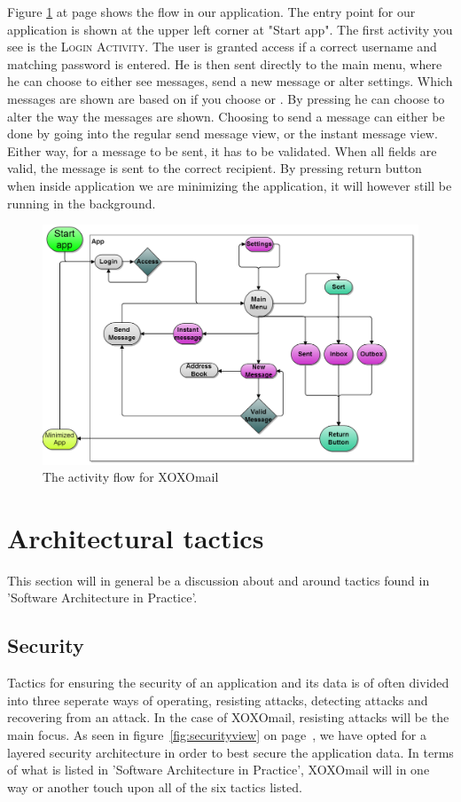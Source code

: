 Figure \ref{fig:logicalGUIview} at page \pageref{fig:logicalGUIview} shows the flow in our application. The entry point for our application is shown at the upper left corner at "Start app". The first activity you see is the \textsc{Login Activity}. The user is granted access if a correct username and matching password is entered. He is then sent directly to the main menu, where he can choose to either see messages, send a new message or alter settings. Which messages are shown are based on if you choose  or . By pressing  he can choose to alter the way the messages are shown. Choosing to send a message can either be done by going into the regular send message view, or the instant message view. Either way, for a message to be sent, it has to be validated. When all fields are valid, the message is sent to the correct recipient. By pressing return button when inside application we are minimizing the application, it will however still be running in the background.

\begin{figure}[h!]
	\includegraphics[width=\textwidth]{activities_flowchart3}
	\caption{The activity flow for XOXOmail}
	\label{fig:logicalGUIview}
\end{figure}



\newpage

\section{Architectural tactics}
	This section will in general be a discussion about and around tactics found in 'Software Architecture in Practice'\cite{bib:archi}. 
	\subsection{Security}
		Tactics for ensuring the security of an application and its data is of often divided into three seperate ways of operating, resisting attacks, detecting attacks and recovering from an attack. 
		In the case of XOXOmail, resisting attacks will be the main focus. As seen in figure~\ref{fig:securityview} on page~\pageref{fig:securityview}, we have opted for a layered security architecture in order to best secure the application data. In terms of what is listed in 'Software Architecture in Practice'\cite[p. 119]{bib:archi}, XOXOmail will in one way or another touch upon all of the six tactics listed. 

